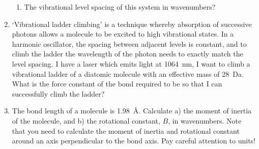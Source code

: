 \documentclass{memoir}[11pt,oneside,a4paper,openany]
\begin{document}
\begin{enumerate}
\begin{enumerate}
		\item The vibrational level spacing of this system in wavenumbers?
	\end{enumerate}
\item `Vibrational ladder climbing' is a technique whereby absorption of successive photons allows a molecule to be excited to high vibrational states. In a harmonic oscillator, the spacing between adjacent levels is constant, and to climb the ladder the wavelength of the photon needs to exactly match the level spacing. I have a laser which emits light at \SI{1064}{\nano\metre}, I want to climb a vibrational ladder of a diatomic molecule with an effective mass of \SI{28}{\dalton}. What is the force constant of the bond required to be so that I can successfully climb the ladder?
\item The bond length of a  molecule is \SI{1.98}{\angstrom}. Calculate a) the moment of inertia of the molecule, and b) the rotational constant, $B$, in wavenumbers. Note that you need to calculate the moment of inertia and rotational constant around an axis perpendicular to the bond axis. Pay careful attention to units!

\end{enumerate}
\end{document}
